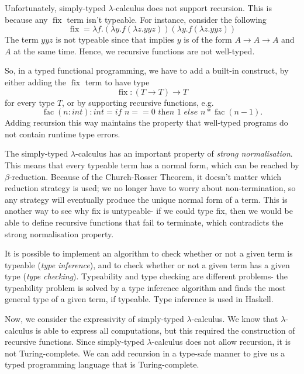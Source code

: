 \documentclass[a4paper, openany]{memoir}
\theoremstyle{definition}
\begin{document}
    Unfortunately, simply-typed $\lambda$-calculus does not support recursion. This is because any $\operatorname{fix}$ term isn't typeable. For instance, consider the following
    \[\operatorname{fix} = \lambda f.(\lambda y.f(\lambda z.yyz))(\lambda y.f(\lambda z.yyz))\]
    The term $yyz$ is not typeable since that implies $y$ is of the form $A \to A \to A$ and $A$ at the same time. Hence, we recursive functions are not well-typed.

    So, in a typed functional programming, we have to add a built-in construct, by either adding the $\operatorname{fix}$ term to have type
    \[\operatorname{fix} \colon (T \to T) \to T\]
    for every type $T$, or by supporting recursive functions, e.g.
    \[\operatorname{fac}(n \colon \textit{int}) \colon \textit{int} = \textit{if } n == 0 \textit{ then } 1 \textit{ else } n * \operatorname{fac}(n-1).\]
    Adding recursion this way maintains the property that well-typed programs do not contain runtime type errors.

    The simply-typed $\lambda$-calculus has an important property of \emph{strong normalisation}. This means that every typeable term has a normal form, which can be reached by $\beta$-reduction. Because of the Church-Rosser Theorem, it doesn't matter which reduction strategy is used; we no longer have to worry about non-termination, so any strategy will eventually produce the unique normal form of a term. This is another way to see why fix is untypeable- if we could type fix, then we would be able to define recursive functions that fail to terminate, which contradicts the strong normalisation property.

    It is possible to implement an algorithm to check whether or not a given term is typeable (\emph{type inference}), and to check whether or not a given term has a given type (\emph{type checking}). Typeability and type checking are different problems- the typeability problem is solved by a type inference algorithm and finds the most general type of a given term, if typeable. Type inference is used in Haskell.

    Now, we consider the expressivity of simply-typed $\lambda$-calculus. We know that $\lambda$-calculus is able to express all computations, but this required the construction of recursive functions. Since simply-typed $\lambda$-calculus does not allow recursion, it is not Turing-complete. We can add recursion in a type-safe manner to give us a typed programming language that is Turing-complete.
    
\end{document}
